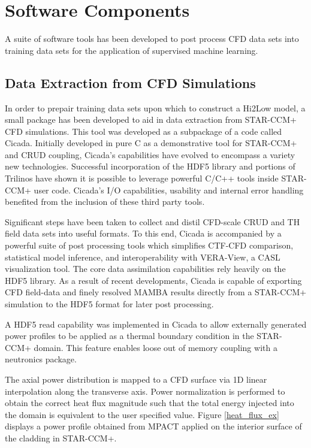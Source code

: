 \section{Software Components}

A suite of software tools has been developed to post process CFD data sets into training data sets for the application of supervised machine learning. 

\subsection{Data Extraction from CFD Simulations}

In order to prepair training data sets upon which to construct a Hi2Low model, a small package has been developed to aid in data extraction from STAR-CCM+ CFD simulations.  This tool was developed as a subpackage of a code called Cicada. Initially developed in pure C as a demonstrative tool for STAR-CCM+ and CRUD coupling, Cicada's capabilities have evolved to encompass a variety new technologies.  Successful incorporation of the HDF5 library and portions of Trilinos have shown it is possible to leverage powerful C/C++ tools inside STAR-CCM+ user code.  Cicada's I/O capabilities, usability and internal error handling benefited from the inclusion of these third party tools.

Significant steps have been taken to collect and distil CFD-scale CRUD and TH field data sets into useful formats.  To this end, Cicada is accompanied by a powerful suite of post processing tools which simplifies CTF-CFD comparison, statistical model inference, and interoperability with VERA-View, a CASL visualization tool. The core data assimilation capabilities rely heavily on the HDF5 library.  As a result of recent developments, Cicada is capable of exporting CFD field-data and finely resolved MAMBA results directly from a STAR-CCM+ simulation to the HDF5 format for later post processing.  

A HDF5 read capability was implemented in Cicada to allow externally generated power profiles to be applied as a thermal boundary condition in the STAR-CCM+ domain.  This feature enables loose out of memory coupling with a neutronics package. 

The axial power distribution is mapped to a CFD surface via 1D linear interpolation along the transverse axis.  Power normalization is performed to obtain the correct heat flux magnitude such that the total energy injected into the domain is equivalent to the user specified value.   Figure \ref{heat_flux_ex} displays a power profile obtained from MPACT applied on the interior surface of the cladding in STAR-CCM+.

